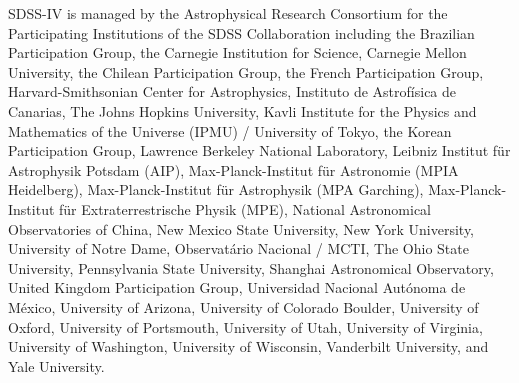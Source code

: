 \documentclass[twocolumn]{aastex62}
\begin{document}
SDSS-IV is managed by the Astrophysical Research Consortium for the 
Participating Institutions of the SDSS Collaboration including the 
Brazilian Participation Group, the Carnegie Institution for Science, 
Carnegie Mellon University, the Chilean Participation Group, the French Participation Group, Harvard-Smithsonian Center for Astrophysics, 
Instituto de Astrof\'isica de Canarias, The Johns Hopkins University, Kavli Institute for the Physics and Mathematics of the Universe (IPMU) / 
University of Tokyo, the Korean Participation Group, Lawrence Berkeley National Laboratory, 
Leibniz Institut f\"ur Astrophysik Potsdam (AIP),  
Max-Planck-Institut f\"ur Astronomie (MPIA Heidelberg), 
Max-Planck-Institut f\"ur Astrophysik (MPA Garching), 
Max-Planck-Institut f\"ur Extraterrestrische Physik (MPE), 
National Astronomical Observatories of China, New Mexico State University, 
New York University, University of Notre Dame, 
Observat\'ario Nacional / MCTI, The Ohio State University, 
Pennsylvania State University, Shanghai Astronomical Observatory, 
United Kingdom Participation Group,
Universidad Nacional Aut\'onoma de M\'exico, University of Arizona, 
University of Colorado Boulder, University of Oxford, University of Portsmouth, 
University of Utah, University of Virginia, University of Washington, University of Wisconsin, 
Vanderbilt University, and Yale University.

%
% 





 


\end{document}
